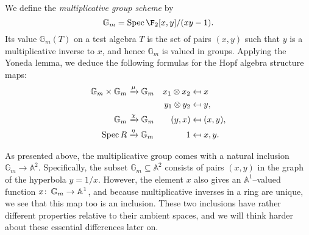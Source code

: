 \begin{example}
We define the \textit{multiplicative group scheme} by \[\mathbb G_m = \Spec \F_2[x, y] / (xy - 1).\]  Its value $\mathbb G_m(T)$ on a test algebra $T$ is the set of pairs $(x, y)$ such that $y$ is a multiplicative inverse to $x$, and hence $\mathbb G_m$ is valued in groups.  Applying the Yoneda lemma, we deduce the following formulas for the Hopf algebra structure maps:
\begin{align*}
\mathbb G_m \times \mathbb G_m & \xrightarrow{\mu} \mathbb G_m & x_1 \otimes x_2 & \mapsfrom x \\
& & y_1 \otimes y_2 & \mapsfrom y, \\
\mathbb G_m & \xrightarrow{\chi} \mathbb G_m & (y, x) & \mapsfrom (x, y), \\
\operatorname{Spec} R & \xrightarrow{\eta} \mathbb G_m & 1 & \mapsfrom x, y.
\end{align*}
\end{example}

\begin{remark}
As presented above, the multiplicative group comes with a natural inclusion $\mathbb G_m \to \mathbb A^2$.  Specifically, the subset $\mathbb G_m \subseteq \mathbb A^2$ consists of pairs $(x, y)$ in the graph of the hyperbola $y = 1/x$.  However, the element $x$ also gives an $\mathbb A^1$--valued function $x\colon\thinspace \mathbb G_m \to \mathbb A^1$, and because multiplicative inverses in a ring are unique, we see that this map too is an inclusion.  These two inclusions have rather different properties relative to their ambient spaces, and we will think harder about these essential differences later on.
\end{remark}

